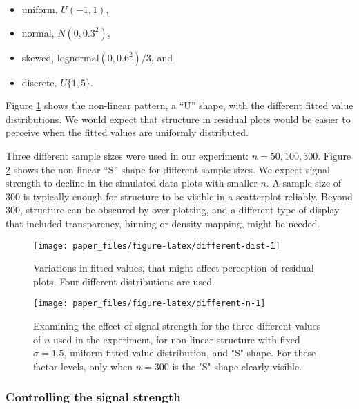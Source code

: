 \documentclass[]{interact}
\theoremstyle{plain}%
\theoremstyle{definition}
\theoremstyle{remark}
\providecommand{\tightlist}{%
  \setlength{\itemsep}{0pt}\setlength{\parskip}{0pt}}
\def\tightlist{}
\begin{document}
\begin{itemize}
\tightlist
\item
  uniform, \(U(-1, 1)\),
\item
  normal, \(N(0, 0.3^2)\),
\item
  skewed, \(\text{lognormal}(0, 0.6^2)/3\), and
\item
  discrete, \(U\{1, 5\}\).
\end{itemize}

\noindent Figure \ref{fig:different-dist} shows the non-linear pattern,
a ``U'' shape, with the different fitted value distributions. We would
expect that structure in residual plots would be easier to perceive when
the fitted values are uniformly distributed.

Three different sample sizes were used in our experiment:
\(n = 50, 100, 300\). Figure \ref{fig:different-n} shows the non-linear
``S'' shape for different sample sizes. We expect signal strength to
decline in the simulated data plots with smaller \(n\). A sample size of
300 is typically enough for structure to be visible in a scatterplot
reliably. Beyond 300, structure can be obscured by over-plotting, and a
different type of display that included transparency, binning or density
mapping, might be needed.

\begin{figure}

{\centering \texttt{[image: paper\_files/figure-latex/different-dist-1]} 

}

\caption{Variations in fitted values, that might affect perception of residual plots. Four different distributions are used.}\label{fig:different-dist}
\end{figure}

\begin{figure}

{\centering \texttt{[image: paper\_files/figure-latex/different-n-1]} 

}

\caption{Examining the effect of signal strength for the three different values of $n$ used in the experiment, for non-linear structure with fixed $\sigma = 1.5$, uniform fitted value distribution, and "S" shape. For these factor levels, only when $n = 300$ is the "S" shape clearly visible.}\label{fig:different-n}
\end{figure}

\hypertarget{controlling-the-signal-strength}{%
\subsubsection{Controlling the signal
strength}\label{controlling-the-signal-strength}}
\end{document}
